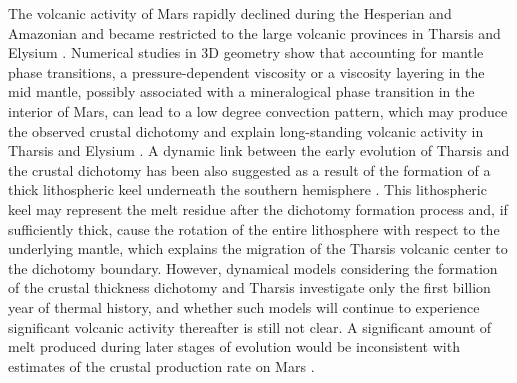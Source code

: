 The volcanic activity of Mars rapidly declined during the Hesperian and Amazonian and became restricted to the large volcanic provinces in Tharsis and Elysium \citep[e.g., ][]{Greeley1981}. Numerical studies in 3D geometry show that accounting for mantle phase transitions, a pressure-dependent viscosity or a viscosity layering in the mid mantle, possibly associated with a mineralogical phase transition in the interior of Mars, can lead to a low degree convection pattern, which may produce the observed crustal dichotomy and explain long-standing volcanic activity in Tharsis and Elysium \citep[e.g.,][]{Harder1996, Breuer1998, Zhong2001, Roberts2006, Keller2009, Sramek2010}. 
A dynamic link between the early evolution of Tharsis and the crustal dichotomy has been also suggested as a result of the formation of a thick lithospheric keel underneath the southern hemisphere \citep{Zhong2009,Sramek2012}. This lithospheric keel may represent the melt residue after the dichotomy formation process and, if sufficiently thick, cause the rotation of the entire lithosphere with respect to the underlying mantle, which explains the migration of the Tharsis volcanic center to the dichotomy boundary. However, dynamical models considering the formation of the crustal thickness dichotomy and Tharsis investigate only the first billion year of thermal history, and whether such models will continue to experience significant volcanic activity thereafter is still not clear. A significant amount of melt produced during later stages of evolution would be inconsistent with estimates of the crustal production rate on Mars \citep{Greeley1991}.

